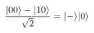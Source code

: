 \documentclass[preview]{standalone}
\begin{document}
\begin{align*}
\special{dvisvgm:raw <g id='unique000'>}\frac{|00\rangle-|10\rangle}{\sqrt{2}}=|-\rangle|0\rangle\special{dvisvgm:raw </g>}
\end{align*}
\end{document}
